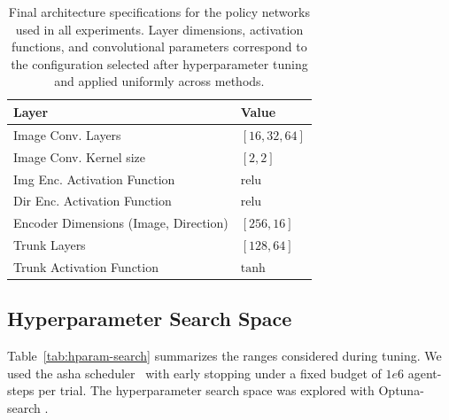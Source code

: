 \documentclass[]{jair}
\begin{document}
\begin{table}[H]
    \centering
    \caption[Policy Network Parameters used for Implicit Indication Experiments.]{
        Final architecture specifications for the policy networks used in all experiments.
        Layer dimensions, activation functions, and convolutional parameters correspond to the 
        configuration selected after hyperparameter tuning and applied uniformly across methods.
    }
    \label{tab:policy_network}
    \begin{tabular}{l l}
        \toprule
        \textbf{Layer} & \textbf{Value} \\
        \midrule
        Image Conv. Layers & \([16, 32, 64]\) \\
        Image Conv. Kernel size & \([2,2]\) \\
        Img Enc. Activation Function & \(\text{relu}\) \\
        Dir Enc. Activation Function & \(\text{relu}\) \\
        Encoder Dimensions (Image, Direction) & \([256, 16]\) \\
        Trunk Layers & \([128, 64]\) \\
        Trunk Activation Function & \(\text{tanh}\) \\
        \bottomrule
    \end{tabular}
\end{table}

\subsection{Hyperparameter Search Space}
Table~\ref{tab:hparam-search} summarizes the ranges considered during tuning.
We used the \gls{asha} scheduler~\cite{li2018b} with early 
stopping under a fixed budget of \(1e6\) agent-steps per trial. 
The hyperparameter search space was explored with Optuna-search \cite{akiba2019}.
\end{document}
